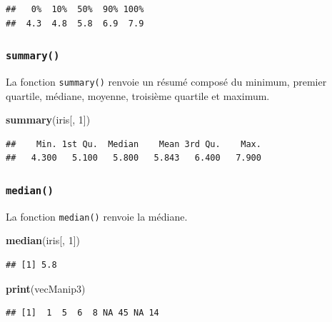 \documentclass[twoside,symmetric]{book}
\newenvironment{Shaded}{}{}
\newcommand{\DecValTok}[1]{#1}
\newcommand{\KeywordTok}[1]{\textbf{#1}}
\newcommand{\NormalTok}[1]{#1}
\begin{document}
\begin{verbatim}
##   0%  10%  50%  90% 100% 
##  4.3  4.8  5.8  6.9  7.9
\end{verbatim}

\hypertarget{l015summary}{%
\subsubsection{\texorpdfstring{\texttt{summary()}}{summary()}}\label{l015summary}}

La fonction \texttt{summary()} renvoie un résumé composé du minimum, premier quartile, médiane, moyenne, troisième quartile et maximum.

\begin{Shaded}
\begin{Highlighting}[]
\KeywordTok{summary}\NormalTok{(iris[, }\DecValTok{1}\NormalTok{])}
\end{Highlighting}
\end{Shaded}

\begin{verbatim}
##    Min. 1st Qu.  Median    Mean 3rd Qu.    Max. 
##   4.300   5.100   5.800   5.843   6.400   7.900
\end{verbatim}

\hypertarget{l015median}{%
\subsubsection{\texorpdfstring{\texttt{median()}}{median()}}\label{l015median}}

La fonction \texttt{median()} renvoie la médiane.

\begin{Shaded}
\begin{Highlighting}[]
\KeywordTok{median}\NormalTok{(iris[, }\DecValTok{1}\NormalTok{])}
\end{Highlighting}
\end{Shaded}

\begin{verbatim}
## [1] 5.8
\end{verbatim}

\begin{Shaded}
\begin{Highlighting}[]
\KeywordTok{print}\NormalTok{(vecManip3)}
\end{Highlighting}
\end{Shaded}

\begin{verbatim}
## [1]  1  5  6  8 NA 45 NA 14
\end{verbatim}
\end{document}
